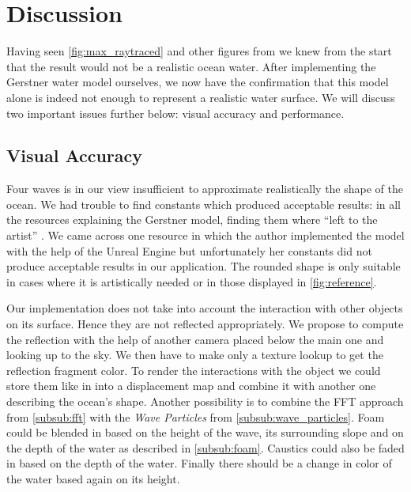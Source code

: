 \section{Discussion}\label{sec:discussion}


Having seen \autoref{fig:max_raytraced} and other figures from
\autocite{fernando2004gpu} we knew from the start that the result would not be a
realistic ocean water. After implementing the Gerstner water model ourselves, we
now have the confirmation that this model alone is indeed not enough to
represent a realistic water surface. We will discuss two important issues
further below: visual accuracy and performance.

\subsection{Visual Accuracy}\label{subsec:visual_accuracy}

Four waves is in our view insufficient to approximate realistically the shape of
the ocean. We had trouble to find constants which produced acceptable results:
in all the resources explaining the Gerstner model, finding them where ``left to
the artist'' \autocite[Chapter~1]{fernando2004gpu}. We came across one resource
\autocite{wiliams2017tutorial} in which the author implemented the model with
the help of the Unreal Engine but unfortunately her constants did not produce
acceptable results in our application. The rounded shape is only suitable in
cases where it is artistically needed or in those displayed in
\autoref{fig:reference}. 

Our implementation does not take into account the interaction with other objects
on its surface. Hence they are not reflected appropriately. We propose to
compute the reflection with the help of another camera placed below the main one
and looking up to the sky. We then have to make only a texture lookup to get the
reflection fragment color. To render the interactions with the object we could
store them like in \autocite{anno2008meersimulation} into a displacement map and
combine it with another one describing the ocean's shape. Another possibility is
to combine the FFT approach from \cref{subsub:fft} with the \textit{Wave
Particles} from \cref{subsub:wave_particles}. Foam could be blended in based on
the height of the wave, its surrounding slope and on the depth of the water as
described in \cref{subsub:foam}. Caustics could also be faded in
based on the depth of the water. Finally there should be a change in color of
the water based again on its height.

